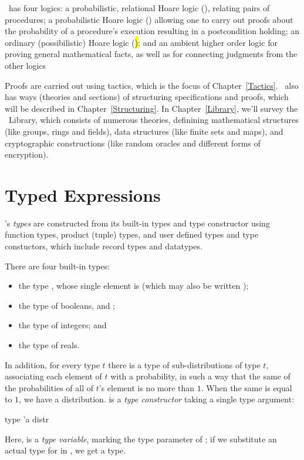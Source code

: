 \EasyCrypt\ has four logics: a probabilistic, relational Hoare logic
(\prhl), relating pairs of procedures; a probabilistic Hoare logic
(\phl) allowing one to carry out proofs about the probability of a
procedure's execution resulting in a postcondition holding; an
ordinary (possibilistic) Hoare logic (\hl); and an ambient higher
order logic for proving general mathematical facts, as well as for
connecting judgments from the other logics

Proofs are carried out using tactics, which is the focus of
Chapter~\ref{Tactics}.  \EasyCrypt\ also has ways (theories and
sections) of structuring specifications and proofs, which will be
described in Chapter~\ref{Structuring}. In Chapter~\ref{Library},
we'll survey the \EasyCrypt\ Library, which consists of numerous
theories, definining mathematical structures (like groups, rings
and fields), data structures (like finite sets and maps), and
cryptographic constructions (like random oracles and different
forms of encryption).

\section{Typed Expressions}

\EasyCrypt's \emph{types} are constructed from its built-in types and type
constructor using function types, product (tuple) types, and user
defined types and type constuctors, which include record types
and datatypes.

There are four built-in types:
\begin{itemize}
\item the type , whose single element is  (which may
  also be written \ec{()});

\item the type  of booleans,  and ;

\item the type  of integers; and

\item the type  of reals.
\end{itemize}

In addition, for every type $t$ there is a type  of
sub-distributions of type $t$, associating each element of $t$
with a probability, in such a way that the same of the probabilities
of all of $t$'s element is no more than $1$. When the same is equal
to $1$, we have a distribution.  is a \emph{type constructor}
taking a single type argument:
\begin{easycrypt}{}{}
  type 'a distr
\end{easycrypt}
Here,  is a \emph{type variable}, marking the type parameter of
; if we substitute an actual type for  in ,
we get a type.

